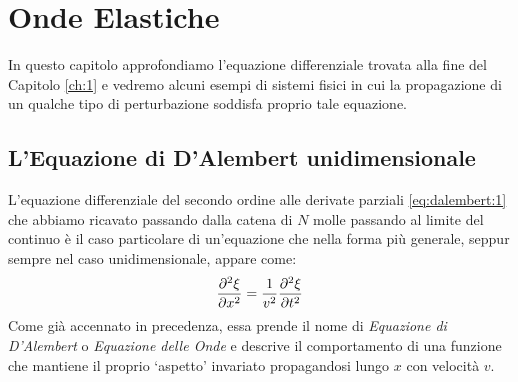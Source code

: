 \chapter{Onde Elastiche}\label{ch:2}
    In questo capitolo approfondiamo l'equazione differenziale trovata alla fine del Capitolo \ref{ch:1} e vedremo alcuni esempi di sistemi fisici in cui la propagazione di un qualche tipo di perturbazione soddisfa proprio tale equazione.
\section{L'Equazione di D'Alembert unidimensionale}
    L'equazione differenziale del secondo ordine alle derivate parziali \eqref{eq:dalembert:1} che abbiamo ricavato passando dalla catena di $N$ molle passando al limite del continuo \`e il caso particolare di un'equazione che nella forma pi\`u generale, seppur sempre nel caso unidimensionale, appare come:
    \begin{equation}
        \pdv[2]{\xi}{x}=\frac{1}{v^2}\pdv[2]{\xi}{t}
        \label{eq:dalembert:2}
    \end{equation}
    Come gi\`a accennato in precedenza, essa prende il nome di \emph{Equazione di D'Alembert} o \emph{Equazione delle Onde} e descrive il comportamento di una funzione che mantiene il proprio `aspetto' invariato propagandosi lungo $x$ con velocit\`a $v$.
